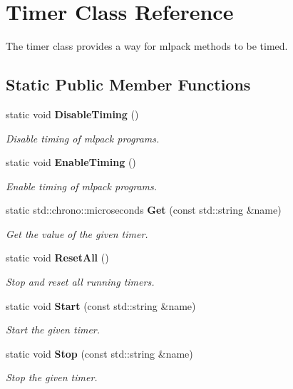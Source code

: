 \section{Timer Class Reference}
\label{classmlpack_1_1Timer}


The timer class provides a way for mlpack methods to be timed.  


\subsection*{Static Public Member Functions}
\begin{DoxyCompactItemize}
\item 
static void \textbf{ Disable\+Timing} ()
\begin{DoxyCompactList}\small\item\em Disable timing of mlpack programs. \end{DoxyCompactList}\item 
static void \textbf{ Enable\+Timing} ()
\begin{DoxyCompactList}\small\item\em Enable timing of mlpack programs. \end{DoxyCompactList}\item 
static std\+::chrono\+::microseconds \textbf{ Get} (const std\+::string \&name)
\begin{DoxyCompactList}\small\item\em Get the value of the given timer. \end{DoxyCompactList}\item 
static void \textbf{ Reset\+All} ()
\begin{DoxyCompactList}\small\item\em Stop and reset all running timers. \end{DoxyCompactList}\item 
static void \textbf{ Start} (const std\+::string \&name)
\begin{DoxyCompactList}\small\item\em Start the given timer. \end{DoxyCompactList}\item 
static void \textbf{ Stop} (const std\+::string \&name)
\begin{DoxyCompactList}\small\item\em Stop the given timer. \end{DoxyCompactList}\end{DoxyCompactItemize}


